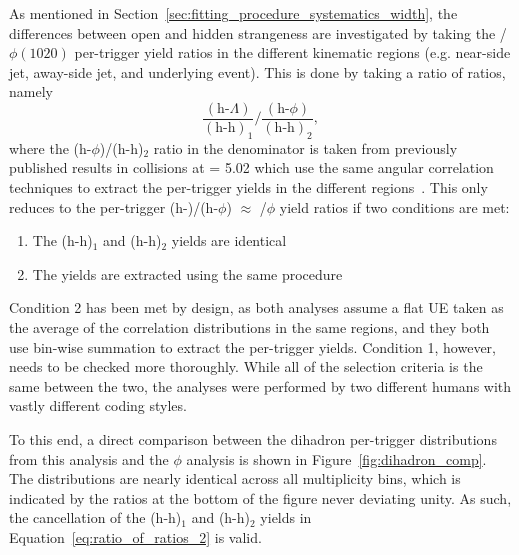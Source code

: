 As mentioned in Section~\ref{sec:fitting_procedure_systematics_width}, the differences between open and hidden strangeness are investigated by taking the \lmb/$\phi(1020)$ per-trigger yield ratios in the different kinematic regions (e.g. near-side jet, away-side jet, and underlying event). This is done by taking a ratio of ratios, namely
%
\begin{equation}
    \label{eq:ratio_of_ratios_2}
    \frac{(\text{h-}\Lambda)}{(\text{h-h})_{1}}/\frac{(\text{h-}\phi)}{(\text{h-h})_{2}},
\end{equation}
%
where the (h-$\phi$)/(h-h)$_2$ ratio in the denominator is taken from previously published results in \pPb collisions at \snn = 5.02 \TeV which use the same angular correlation techniques to extract the per-trigger yields in the different regions~\cite{JustinPaper}. This only reduces to the per-trigger (h-\lmb)/(h-$\phi$) $\approx$ \lmb/$\phi$ yield ratios if two conditions are met:
%
\begin{enumerate}
    \item The (h-h)$_1$ and (h-h)$_2$ yields are identical
    \item The yields are extracted using the same procedure
\end{enumerate}
% 
Condition 2 has been met by design, as both analyses assume a flat UE taken as the average of the correlation distributions in the same \dphi regions, and they both use bin-wise summation to extract the per-trigger yields. Condition 1, however, needs to be checked more thoroughly. While all of the selection criteria is the same between the two, the analyses were performed by two different humans with vastly different coding styles.

To this end, a direct comparison between the dihadron per-trigger \dphi distributions from this analysis and the $\phi$ analysis is shown in Figure~\ref{fig:dihadron_comp}. The distributions are nearly identical across all multiplicity bins, which is indicated by the ratios at the bottom of the figure never deviating unity. As such, the cancellation of the (h-h)$_1$ and (h-h)$_2$ yields in Equation~\ref{eq:ratio_of_ratios_2} is valid.

